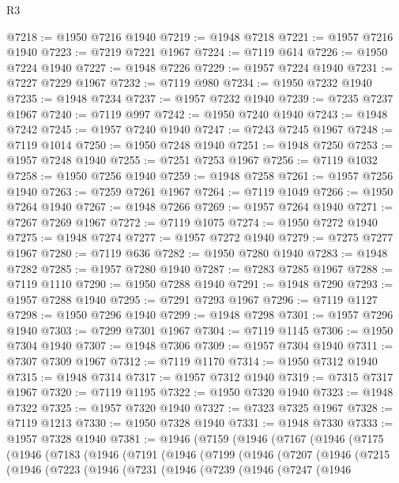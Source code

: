 \begin{lexlean}{R3}
\begin{coremodule}
@7218 := @1950 @7216 @1940
@7219 := @1948 @7218
@7221 := @1957 @7216 @1940
@7223 := @7219 @7221 @1967
@7224 := @7119 @614
@7226 := @1950 @7224 @1940
@7227 := @1948 @7226
@7229 := @1957 @7224 @1940
@7231 := @7227 @7229 @1967
@7232 := @7119 @980
@7234 := @1950 @7232 @1940
@7235 := @1948 @7234
@7237 := @1957 @7232 @1940
@7239 := @7235 @7237 @1967
@7240 := @7119 @997
@7242 := @1950 @7240 @1940
@7243 := @1948 @7242
@7245 := @1957 @7240 @1940
@7247 := @7243 @7245 @1967
@7248 := @7119 @1014
@7250 := @1950 @7248 @1940
@7251 := @1948 @7250
@7253 := @1957 @7248 @1940
@7255 := @7251 @7253 @1967
@7256 := @7119 @1032
@7258 := @1950 @7256 @1940
@7259 := @1948 @7258
@7261 := @1957 @7256 @1940
@7263 := @7259 @7261 @1967
@7264 := @7119 @1049
@7266 := @1950 @7264 @1940
@7267 := @1948 @7266
@7269 := @1957 @7264 @1940
@7271 := @7267 @7269 @1967
@7272 := @7119 @1075
@7274 := @1950 @7272 @1940
@7275 := @1948 @7274
@7277 := @1957 @7272 @1940
@7279 := @7275 @7277 @1967
@7280 := @7119 @636
@7282 := @1950 @7280 @1940
@7283 := @1948 @7282
@7285 := @1957 @7280 @1940
@7287 := @7283 @7285 @1967
@7288 := @7119 @1110
@7290 := @1950 @7288 @1940
@7291 := @1948 @7290
@7293 := @1957 @7288 @1940
@7295 := @7291 @7293 @1967
@7296 := @7119 @1127
@7298 := @1950 @7296 @1940
@7299 := @1948 @7298
@7301 := @1957 @7296 @1940
@7303 := @7299 @7301 @1967
@7304 := @7119 @1145
@7306 := @1950 @7304 @1940
@7307 := @1948 @7306
@7309 := @1957 @7304 @1940
@7311 := @7307 @7309 @1967
@7312 := @7119 @1170
@7314 := @1950 @7312 @1940
@7315 := @1948 @7314
@7317 := @1957 @7312 @1940
@7319 := @7315 @7317 @1967
@7320 := @7119 @1195
@7322 := @1950 @7320 @1940
@7323 := @1948 @7322
@7325 := @1957 @7320 @1940
@7327 := @7323 @7325 @1967
@7328 := @7119 @1213
@7330 := @1950 @7328 @1940
@7331 := @1948 @7330
@7333 := @1957 @7328 @1940
@7381 := @1946
    (@7159
      (@1946
        (@7167
          (@1946
            (@7175
              (@1946
                (@7183
                  (@1946
                    (@7191
                      (@1946
                        (@7199
                          (@1946
                            (@7207
                              (@1946
                                (@7215
                                  (@1946
                                    (@7223
                                      (@1946
                                        (@7231
                                          (@1946
                                            (@7239
                                              (@1946
                                                (@7247
                                                  (@1946

\end{coremodule}
\end{lexlean}
